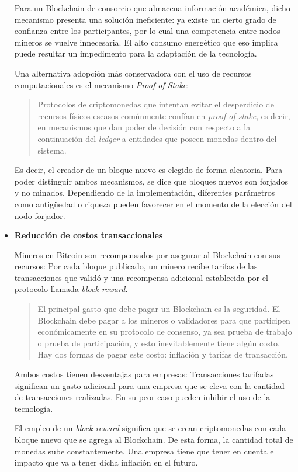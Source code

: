\begin{itemize}
Para un Blockchain de consorcio que almacena información académica, dicho mecanismo presenta una solución ineficiente: ya existe un cierto grado de confianza entre los participantes, por lo cual una competencia entre nodos mineros se vuelve innecesaria. El alto consumo energético que eso implica puede resultar un impedimento para la adaptación de la tecnología.

Una alternativa adopción más conservadora con el uso de recursos computacionales es el mecanismo \textit{Proof of Stake}:
\begin{quote}
Protocolos de criptomonedas que intentan evitar el desperdicio de recursos físicos escasos comúnmente confían en \textit{proof of stake}, es decir, en mecanismos que dan poder de decisión con respecto a la continuación del \textit{ledger} a entidades que poseen monedas dentro del sistema.\cite{DBLP:journals/corr/BentovGM14}
\end{quote}
Es decir, el creador de un bloque nuevo es elegido de forma aleatoria. Para poder distinguir ambos mecanismos, se dice que bloques nuevos son forjados y no minados. Dependiendo de la implementación, diferentes parámetros como antigüedad o riqueza pueden favorecer en el momento de la elección del nodo forjador. 

\item \textbf{Reducción de costos transaccionales}

Mineros en Bitcoin son recompensados por asegurar al Blockchain con sus recursos: Por cada bloque publicado, un minero recibe tarifas de las transacciones que validó y una recompensa adicional establecida por el protocolo llamada \textit{block reward}.
\begin{quote}
El principal gasto que debe pagar un Blockchain es la seguridad. El Blockchain debe pagar a los mineros o validadores para que participen económicamente en su protocolo de consenso, ya sea prueba de trabajo o prueba de participación, y esto inevitablemente tiene algún costo. Hay dos formas de pagar este costo: inflación y tarifas de transacción.\cite{bc_tarifas}
\end{quote}
Ambos costos tienen desventajas para empresas:  
Transacciones tarifadas significan un gasto adicional para una empresa que se eleva con la cantidad de transacciones realizadas. En su peor caso pueden inhibir el uso de la tecnología.

El empleo de un \textit{block reward} significa que se crean criptomonedas con cada bloque nuevo que se agrega al Blockchain. De esta forma, la cantidad total de monedas sube constantemente. Una empresa tiene que tener en cuenta el impacto que va a tener dicha inflación en el futuro.


\end{itemize}
